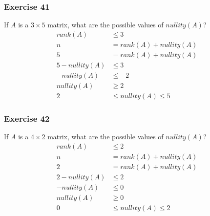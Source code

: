 \documentclass[letterpaper, 12pt]{math}
\begin{document}
\subsubsection*{Exercise 41}
If \( A \) is a \( 3\times5 \) matrix, what are the possible values of
\( nullity(A) \)?
\begin{align*}
  rank(A) &\le 3 \\
  n &= rank(A)+nullity(A) \\
  5 &= rank(A)+nullity(A) \\
  5-nullity(A) &\le 3 \\
  -nullity(A) &\le -2 \\
  nullity(A) &\ge 2 \\
  2 &\le nullity(A) \le 5
\end{align*}

\subsubsection*{Exercise 42}
If \( A \) is a \( 4\times2 \) matrix, what are the possible values of
\( nullity(A) \)?
\begin{align*}
  rank(A) &\le 2 \\
  n &= rank(A)+nullity(A) \\
  2 &= rank(A)+nullity(A) \\
  2-nullity(A) &\le 2 \\
  -nullity(A) &\le 0 \\
  nullity(A) &\ge 0 \\
  0 &\le nullity(A) \le 2
\end{align*}
\end{document}
